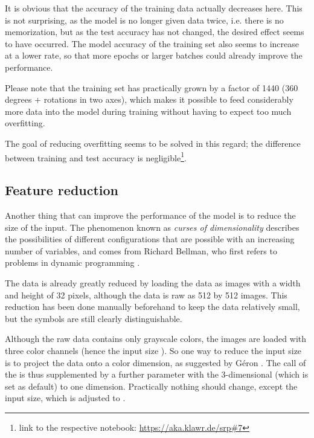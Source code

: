 It is obvious that the accuracy of the training data actually decreases here.
This is not surprising, as the model is no longer given data twice, i.e. there is no memorization, but as the test accuracy has not changed, the desired effect seems to have occurred.
The model accuracy of the training set also seems to increase at a lower rate, so that more epochs or larger batches could already improve the performance.

Please note that the training set has practically grown by a factor of 1440 (360 degrees + rotations in two axes), which makes it possible to feed considerably more data into the model during training without having to expect too much overfitting.

The goal of reducing overfitting seems to be solved in this regard; the difference between training and test accuracy is negligible\footnote{link to the respective notebook: \url{https://aka.klawr.de/srp\#7}}.

\subsection{Feature reduction}

Another thing that can improve the performance of the model is to reduce the size of the input.
The phenomenon known as \textit{curses of dimensionality} describes the possibilities of different configurations that are possible with an increasing number of variables, and comes from Richard Bellman, who first refers to problems in dynamic programming \cite[p.ix]{Bellman1957}.

The data is already greatly reduced by loading the data as images with a width and height of 32 pixels, although the data is raw as 512 by 512 images. This reduction has been done manually beforehand to keep the data relatively small, but the symbols are still clearly distinguishable.

Although the raw data contains only grayscale colors, the images are loaded with three color channels (hence the input size \code{[32, 32, 3]}).
So one way to reduce the input size is to project the data onto a color dimension, as suggested by Géron \cite[p.215]{Geron2019}.
The call of the  is thus supplemented by a further parameter  with the 3-dimensional  (which is set as default) to one dimension.
Practically nothing should change, except the input size, which is adjusted to \code{[32, 32, 1]}.


